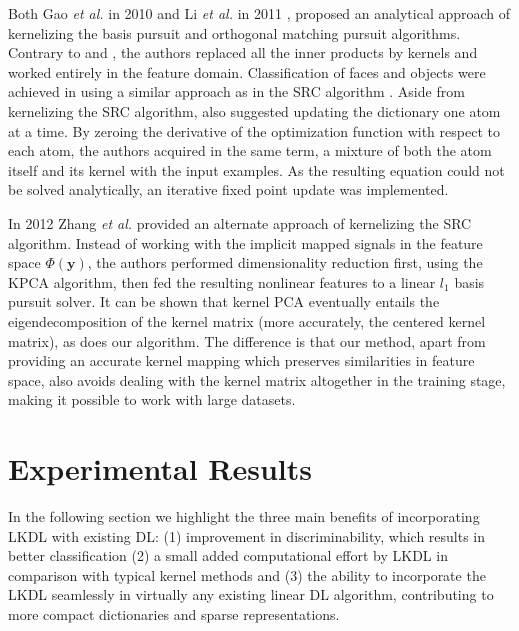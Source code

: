 \documentclass[journal]{IEEEtran}
\newcommand{\by}{\mathbf{y}}
\begin{document}
Both Gao \textit{et al.} in 2010 \cite{KSR} and Li \textit{et al.} in 2011 \cite{KernelOMP}, proposed an analytical approach of kernelizing the basis pursuit and orthogonal matching pursuit algorithms. Contrary to \cite{KMP} and \cite{KBP}, the authors replaced all the inner products by kernels and worked entirely in the feature domain. Classification of faces and objects were achieved in \cite{KSR} using a similar approach as in the SRC algorithm \cite{Classification}.
Aside from kernelizing the SRC algorithm, \cite{KSR} also suggested updating the dictionary one atom at a time. By zeroing the derivative of the optimization function with respect to each atom, the authors acquired in the same term, a mixture of both the atom itself and its kernel with the input examples. As the resulting equation could not be solved analytically, an iterative fixed point update was implemented.

In 2012 Zhang \textit{et al.} \cite{KernelSRC1} provided an alternate approach of kernelizing the SRC algorithm. Instead of working with the implicit mapped signals in the feature space $\Phi(\by)$, the authors performed dimensionality reduction first, using the KPCA algorithm, then fed the resulting nonlinear features to a linear $l_1$ basis pursuit solver.
It can be shown that kernel PCA eventually entails the eigendecomposition of the kernel matrix (more accurately, the centered kernel matrix), as does our algorithm. The difference is that our method, apart from providing an accurate kernel mapping which preserves similarities in feature space, also avoids dealing with the kernel matrix altogether in the training stage, making it possible to work with large datasets.

\section{Experimental Results} \label{Results}

In the following section we highlight the three main benefits of incorporating LKDL with existing DL: (1) improvement in discriminability, which results in better classification (2) a small added computational effort by LKDL in comparison with typical kernel methods and (3) the ability to incorporate the LKDL seamlessly in virtually any existing linear DL algorithm, contributing to more compact dictionaries and sparse representations.
\end{document}
